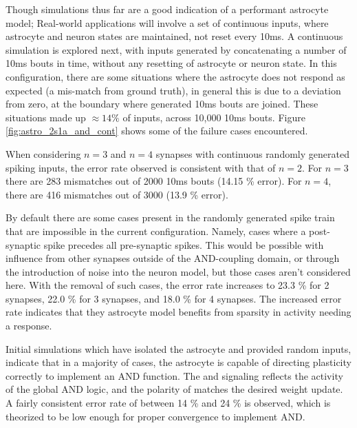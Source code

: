 Though simulations thus far are a good indication of a performant astrocyte
model; Real-world applications will involve a set of continuous inputs, where
astrocyte and neuron states are maintained, not reset every 10ms. A continuous
simulation is explored next, with inputs generated by concatenating a number of
10ms bouts in time, without any resetting of astrocyte or neuron state. In this
configuration, there are some situations where the astrocyte does not respond as
expected (a mis-match from ground truth), in general this is due to a \ca
deviation from zero, at the boundary where generated 10ms bouts are
joined. These situations made up $\approx 14\%$ of inputs, across 10,000 10ms
bouts. Figure \ref{fig:astro_2s1a_and_cont} shows some of the failure cases
encountered.


When considering $n=3$ and $n=4$ synapses with continuous randomly generated
spiking inputs, the error rate observed is consistent with that of $n=2$. For
$n=3$ there are 283 mismatches out of 2000 10ms bouts (14.15 \% error). For
$n=4$, there are 416 mismatches out of 3000 (13.9 \% error).

By default there are some cases present in the randomly generated spike train
that are impossible in the current configuration. Namely, cases where a
post-synaptic spike precedes all pre-synaptic spikes. This would be possible
with influence from other synapses outside of the AND-coupling domain, or
through the introduction of noise into the neuron model, but those cases aren't
considered here. With the removal of such cases, the error rate increases to
23.3 \% for 2 synapses, 22.0 \% for 3 synapses, and 18.0 \% for 4 synapses. The
increased error rate indicates that they astrocyte model benefits from sparsity
in activity needing a response.

Initial simulations which have isolated the astrocyte and provided random
inputs, indicate that in a majority of cases, the astrocyte is capable of
directing plasticity correctly to implement an AND function. The
\dser and \serca signaling reflects the activity of the global AND logic, and
the polarity of \dser matches the desired weight update. A fairly consistent
error rate of between 14 \% and 24 \% is observed, which is theorized to be low
enough for proper convergence to implement AND.


